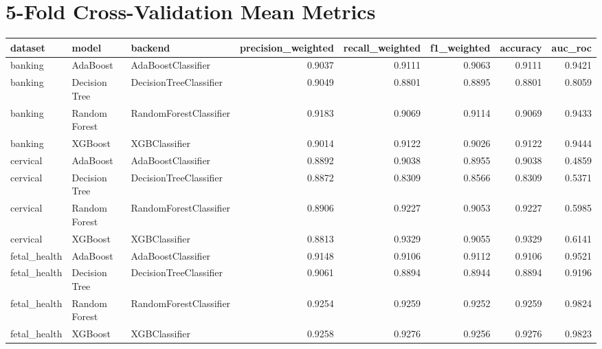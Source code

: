 \documentclass[11pt]{article}
\begin{document}
\section*{5-Fold Cross-Validation Mean Metrics}
\begin{tabular}{lllrrrrr}
\toprule
      dataset &          model &                 backend &  precision\_weighted &  recall\_weighted &  f1\_weighted &  accuracy &  auc\_roc \\
\midrule
      banking &       AdaBoost &      AdaBoostClassifier &              0.9037 &           0.9111 &       0.9063 &    0.9111 &   0.9421 \\
      banking &  Decision Tree &  DecisionTreeClassifier &              0.9049 &           0.8801 &       0.8895 &    0.8801 &   0.8059 \\
      banking &  Random Forest &  RandomForestClassifier &              0.9183 &           0.9069 &       0.9114 &    0.9069 &   0.9433 \\
      banking &        XGBoost &           XGBClassifier &              0.9014 &           0.9122 &       0.9026 &    0.9122 &   0.9444 \\
     cervical &       AdaBoost &      AdaBoostClassifier &              0.8892 &           0.9038 &       0.8955 &    0.9038 &   0.4859 \\
     cervical &  Decision Tree &  DecisionTreeClassifier &              0.8872 &           0.8309 &       0.8566 &    0.8309 &   0.5371 \\
     cervical &  Random Forest &  RandomForestClassifier &              0.8906 &           0.9227 &       0.9053 &    0.9227 &   0.5985 \\
     cervical &        XGBoost &           XGBClassifier &              0.8813 &           0.9329 &       0.9055 &    0.9329 &   0.6141 \\
 fetal\_health &       AdaBoost &      AdaBoostClassifier &              0.9148 &           0.9106 &       0.9112 &    0.9106 &   0.9521 \\
 fetal\_health &  Decision Tree &  DecisionTreeClassifier &              0.9061 &           0.8894 &       0.8944 &    0.8894 &   0.9196 \\
 fetal\_health &  Random Forest &  RandomForestClassifier &              0.9254 &           0.9259 &       0.9252 &    0.9259 &   0.9824 \\
 fetal\_health &        XGBoost &           XGBClassifier &              0.9258 &           0.9276 &       0.9256 &    0.9276 &   0.9823 \\
\bottomrule
\end{tabular}
\end{document}
